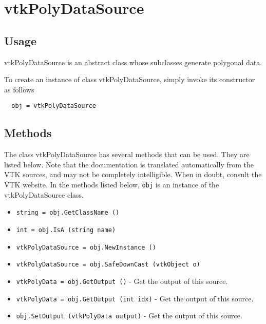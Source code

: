 \section{vtkPolyDataSource}

\subsection{Usage}

 vtkPolyDataSource is an abstract class whose subclasses generate polygonal
 data.

To create an instance of class vtkPolyDataSource, simply
invoke its constructor as follows
\begin{verbatim}
  obj = vtkPolyDataSource
\end{verbatim}
\subsection{Methods}

The class vtkPolyDataSource has several methods that can be used.
  They are listed below.
Note that the documentation is translated automatically from the VTK sources,
and may not be completely intelligible.  When in doubt, consult the VTK website.
In the methods listed below, \verb|obj| is an instance of the vtkPolyDataSource class.
\begin{itemize}
\item  \verb|string = obj.GetClassName ()|

\item  \verb|int = obj.IsA (string name)|

\item  \verb|vtkPolyDataSource = obj.NewInstance ()|

\item  \verb|vtkPolyDataSource = obj.SafeDownCast (vtkObject o)|

\item  \verb|vtkPolyData = obj.GetOutput ()| -  Get the output of this source.

\item  \verb|vtkPolyData = obj.GetOutput (int idx)| -  Get the output of this source.

\item  \verb|obj.SetOutput (vtkPolyData output)| -  Get the output of this source.

\end{itemize}
